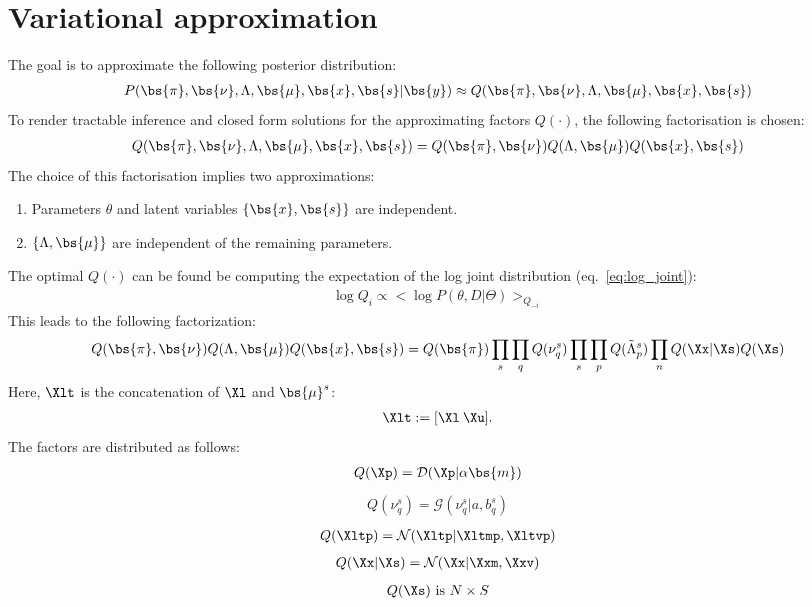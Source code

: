 \documentclass[a4paper]{article}
\begin{document}
\section{Variational approximation}
The goal is to approximate the following posterior distribution:
\begin{align}
  P(\bs{\pi},\bs{\nu},\Lambda,\bs{\mu},\bs{x},\bs{s}|\bs{y}) \approx Q(\bs{\pi},\bs{\nu},\Lambda,\bs{\mu},\bs{x},\bs{s})
\end{align}
To render tractable inference and closed form solutions for the approximating factors $Q(\cdot)$, the following factorisation is chosen:
\begin{align}
  Q(\bs{\pi},\bs{\nu},\Lambda,\bs{\mu},\bs{x},\bs{s})=Q(\bs{\pi},\bs{\nu})Q(\Lambda,\bs{\mu})Q(\bs{x},\bs{s})
\end{align}
The choice of this factorisation implies two approximations:
\begin{enumerate}
  \item Parameters $\theta$ and latent variables $\left\{\bs{x},\bs{s}\right\}$ are independent.
  \item $\left\{\Lambda,\bs{\mu}\right\}$ are independent of the remaining parameters.
\end{enumerate}
The optimal $Q(\cdot)$ can be found be computing the expectation of the log joint distribution (eq.~\ref{eq:log_joint}):
\begin{align}
  \log Q_i \propto <\log P(\theta,D|\Theta)>_{Q_{-i}}
\end{align}
This leads to the following factorization:
\begin{align}
  Q(\bs{\pi},\bs{\nu})Q(\Lambda,\bs{\mu})Q(\bs{x},\bs{s})=Q(\bs{\pi})\prod_s\prod_q Q(\nu_q^s)\prod_s\prod_p Q(\tilde{\Lambda}^s_p) \prod_n Q(\Xx|\Xs)Q(\Xs)
\end{align}
Here, $\Xlt$ is the concatenation of $\Xl$ and $\bs{\mu}^s$:
\begin{align}
  \Xlt:=[\Xl \: \Xu].
\end{align}
The factors are distributed as follows:
\begin{align}
  Q(\Xp)=\mathcal{D}(\Xp|\alpha\bs{m})
\end{align}
\begin{align}
 Q(\nu^s_q)=\mathcal{G}(\nu^s_q|a, b_q^s)
\end{align}
\begin{align}
  Q(\Xltp)=\mathcal{N}(\Xltp|\Xltmp,\Xltvp)
\end{align}
\begin{align}
  Q(\Xx|\Xs)=\mathcal{N}(\Xx|\Xxm,\Xxv)
\end{align}
\begin{align}
  Q(\Xs)\text{ is }N\times S
\end{align}
\end{document}
